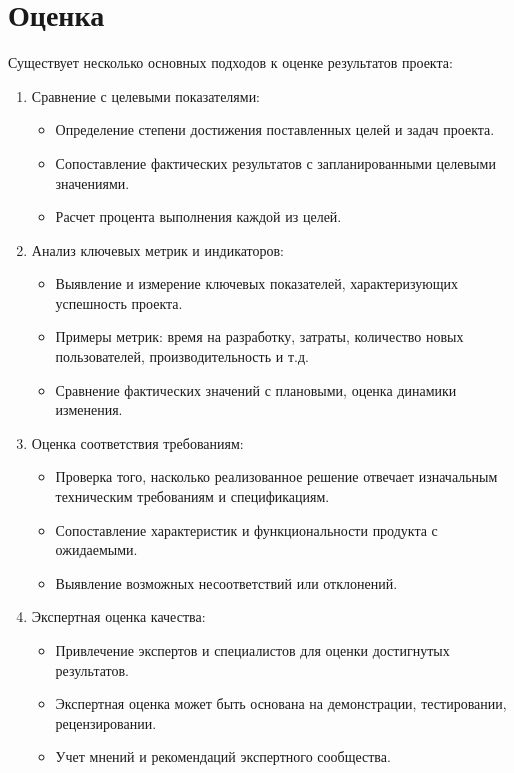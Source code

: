 \section{Оценка}
Существует несколько основных подходов к оценке результатов проекта:
\begin{enumerate}
    \item Сравнение с целевыми показателями:
        \begin{itemize}
            \item Определение степени достижения поставленных целей и задач проекта.
            \item Сопоставление фактических результатов с запланированными целевыми значениями.
            \item Расчет процента выполнения каждой из целей.
        \end{itemize}
    \item Анализ ключевых метрик и индикаторов:
        \begin{itemize}
            \item Выявление и измерение ключевых показателей, характеризующих успешность проекта.
            \item Примеры метрик: время на разработку, затраты, количество новых пользователей, производительность и т.д.
            \item Сравнение фактических значений с плановыми, оценка динамики изменения.
        \end{itemize}
    \item Оценка соответствия требованиям:
        \begin{itemize}
            \item Проверка того, насколько реализованное решение отвечает изначальным техническим требованиям и спецификациям.
            \item Сопоставление характеристик и функциональности продукта с ожидаемыми.
            \item Выявление возможных несоответствий или отклонений.
        \end{itemize}
    \item Экспертная оценка качества:
        \begin{itemize}
            \item Привлечение экспертов и специалистов для оценки достигнутых результатов.
            \item Экспертная оценка может быть основана на демонстрации, тестировании, рецензировании.
            \item Учет мнений и рекомендаций экспертного сообщества.

\end{itemize}
\end{enumerate}
